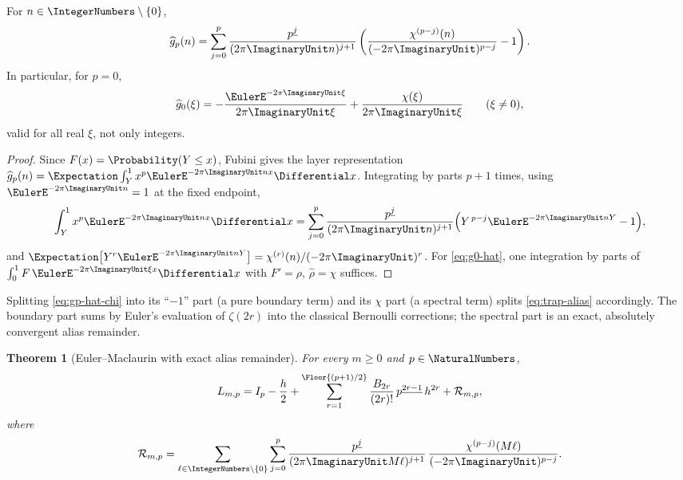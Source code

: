 \documentclass[11pt,oneside]{article}
\numberwithin{equation}{section}
\newtheorem{theorem}{Theorem}[section]
\theoremstyle{definition}
\theoremstyle{remark}
\newcommand{\fall}[2]{#1^{\underline{#2}}}
\newcommand{\defect}{\mathcal R}
\begin{document}
\begin{lemma}
\label{lem:gp-hat}
For $n\in\IntegerNumbers\setminus\{0\}$,
\begin{equation}
 \widehat g_p(n)
 =\sum_{j=0}^{p}
 \frac{\fall pj}{(2\pi\ImaginaryUnit n)^{j+1}}
 \left(
 \frac{\chi^{(p-j)}(n)}{(-2\pi\ImaginaryUnit)^{p-j}}-1
 \right).
 \label{eq:gp-hat-chi}
\end{equation}
In particular, for $p=0$,
\begin{equation}
 \widehat g_0(\xi)
 =-\frac{\EulerE^{-2\pi\ImaginaryUnit\xi}}{2\pi\ImaginaryUnit\xi}
 +\frac{\chi(\xi)}{2\pi\ImaginaryUnit\xi}
 \qquad(\xi\ne0),
 \label{eq:g0-hat}
\end{equation}
valid for all real $\xi$, not only integers.
\end{lemma}

\begin{proof}
Since $F(x)=\Probability(Y\le x)$, Fubini gives the layer representation
$\widehat g_p(n)=\Expectation\int_Y^1x^{p}\EulerE^{-2\pi\ImaginaryUnit nx}\Differential x$.  Integrating by
parts $p+1$ times, using $\EulerE^{-2\pi\ImaginaryUnit n}=1$ at the fixed endpoint,
\[
 \int_Y^1x^{p}\EulerE^{-2\pi\ImaginaryUnit nx}\Differential x
 =\sum_{j=0}^{p}\frac{\fall pj}{(2\pi\ImaginaryUnit n)^{j+1}}
 \Bigl(Y^{\,p-j}\EulerE^{-2\pi\ImaginaryUnit nY}-1\Bigr),
\]
and $\Expectation\bigl[Y^{r}\EulerE^{-2\pi\ImaginaryUnit nY}\bigr]=\chi^{(r)}(n)/(-2\pi\ImaginaryUnit)^{r}$.
For \eqref{eq:g0-hat}, one integration by parts of
$\int_0^1F\,\EulerE^{-2\pi\ImaginaryUnit\xi x}\Differential x$ with $F'=\rho$,
$\widehat\rho=\chi$ suffices.
\end{proof}

Splitting \eqref{eq:gp-hat-chi} into its ``$-1$'' part (a pure
boundary term) and its $\chi$ part (a spectral term) splits
\eqref{eq:trap-alias} accordingly.  The boundary part sums by Euler's
evaluation of $\zeta(2r)$ into the classical Bernoulli corrections; the
spectral part is an exact, absolutely convergent alias remainder.

\begin{theorem}[Euler--Maclaurin with exact alias remainder]
\label{thm:EM-remainder}
For every $m\ge0$ and $p\in\NaturalNumbers$,
\begin{equation}
 L_{m,p}=I_p-\frac h2+
 \sum_{r=1}^{\Floor{(p+1)/2}}
 \frac{B_{2r}}{(2r)!}\,\fall p{2r-1}\,h^{2r}
 +\defect_{m,p},
 \label{eq:EM-exact-remainder}
\end{equation}
where
\begin{equation}
 \defect_{m,p}
 =\sum_{\ell\in\IntegerNumbers\setminus\{0\}}
 \sum_{j=0}^{p}
 \frac{\fall pj}{(2\pi\ImaginaryUnit M\ell)^{j+1}}\,
 \frac{\chi^{(p-j)}(M\ell)}{(-2\pi\ImaginaryUnit)^{p-j}}.
 \label{eq:R-alias}
\end{equation}
\end{theorem}
\end{document}
